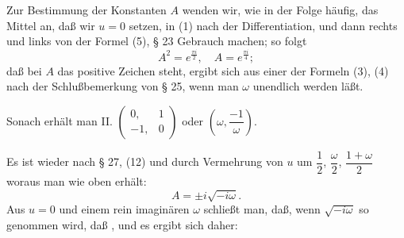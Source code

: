 Zur Bestimmung der Konstanten $A$ wenden wir, wie in der Folge häufig, das Mittel an, daß wir $u = 0$ setzen, in (1) nach der Differentiation, und dann rechts und links von der Formel (5), § 23
Gebrauch machen; so folgt
\[
A^2 = e^{\frac{\pi i}{2}}, \quad A = e^{\frac{\pi i}{4}};
\]
daß bei $A$ das positive Zeichen steht, ergibt sich aus einer der Formeln (3), (4) nach der Schlußbemerkung von § 25, wenn man $\omega$ unendlich werden läßt.

Sonach erhält man
II. $\begin{pmatrix} 0, & 1 \\ -1, & 0 \end{pmatrix}$ oder $\left(\omega, \dfrac{-1}{\omega}\right)$.

Es ist wieder nach § 27, (12)
und durch Vermehrung von $u$ um $\dfrac{1}{2}$, $\dfrac{\omega}{2}$, $\dfrac{1+\omega}{2}$
woraus man wie oben erhält:
\[
A = \pm i\sqrt{-i\omega}.
\]
Aus $u = 0$ und einem rein imaginären $\omega$ schließt man, daß, wenn $\sqrt{-i\omega}$ so genommen wird, daß , und es ergibt sich daher:
